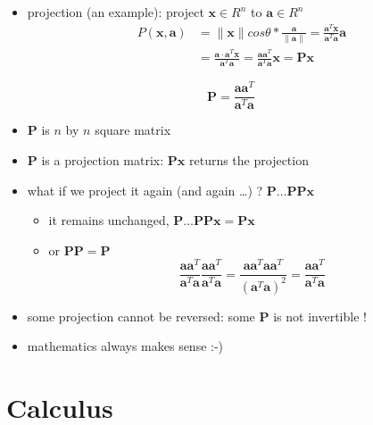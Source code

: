\documentclass{scrartcl}
\def\tightlist{}
\newcommand{\vv}[1]{\boldsymbol{#1}}
\begin{document}
\begin{frame}{}
\protect\hypertarget{section-5}{}

\begin{itemize}
\tightlist
\item
  projection (an example): project \(\vv{x}\in R^n\) to
  \(\vv{a}\in R^n\)
  \begin{align*}P(\vv{x}, \vv{a}) &= \|\vv{x}\|cos \theta * \frac{\vv{a}}{\|\vv{a}\|} =  \frac{\vv{a}^T\vv{x}}{\vv{a}^T\vv{a}}  \vv{a} \\
  &= \frac{\vv{a}\cdot \vv{a}^T\vv{x}}{\vv{a}^T\vv{a}} = \frac{\vv{a}\vv{a}^T}{\vv{a}^{T}\vv{a}}\vv{x}=\vv{Px}\end{align*}
\end{itemize}

\[\vv{P} = \frac{\vv{a}\vv{a}^T}{\vv{a}^{T}\vv{a}}\]

\begin{itemize}
\tightlist
\item
  \(\vv{P}\) is \(n\) by \(n\) square matrix
\item
  \(\vv{P}\) is a projection matrix: \(\vv{Px}\) returns the projection
\item
  what if we project it again (and again \ldots{}) ?
  \(\vv{P}\ldots\vv{P}\vv{P}\vv{x}\) \pause 

  \begin{itemize}
  \tightlist
  \item
    it remains unchanged,
    \(\vv{P}\ldots\vv{P}\vv{P}\vv{x} = \vv{P}\vv{x}\)
  \item
    or \(\vv{P}\vv{P} = \vv{P}\)
    \[\frac{\vv{a}\vv{a}^T}{\vv{a}^{T}\vv{a}}\frac{\vv{a}\vv{a}^T}{\vv{a}^{T}\vv{a}}= \frac{\vv{aa}^T\vv{aa}^T}{(\vv{a}^T\vv{a})^2}= \frac{\vv{a}\vv{a}^T}{\vv{a}^{T}\vv{a}}\]
  \end{itemize}
\item
  some projection cannot be reversed: some \(\vv{P}\) is not invertible
  !
\item
  mathematics always makes sense :-)
\end{itemize}

\section{Calculus}

\end{frame}
\end{document}
